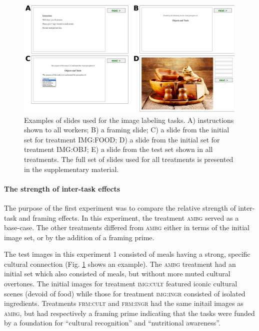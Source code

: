 \documentclass[12pt]{article}
\begin{document}
\begin{figure}
	\centering
	\includegraphics[scale=0.7]{figs/tasks.pdf}
	\caption{Examples of slides used for the image labeling tasks. A) instructions shown to all workers; B) a framing slide; C) a slide from the initial set for treatment IMG:FOOD; D) a slide from the initial set for treatment IMG:OBJ; E) a slide from the test set shown in all treatments. The full set of slides used for all treatments is presented in the supplementary material.}
	\label{fig:task}
\end{figure}




\paragraph{The strength of inter-task effects}
The purpose of the first experiment was to compare the relative strength
of inter-task and framing effects.  In this experiment, the treatment 
\textsc{ambg} served as a base-case.  The other treatments differed from
\textsc{ambg} either in terms of the initial image set, or by the addition of a
framing prime.  

The test images in this experiment 1 consisted of meals having
a strong, specific cultural connection (Fig. \ref{fig:task} shows an example).
The \textsc{ambg} treatment had an initial set which also consisted of meals,
but without more muted cultural overtones.  The initial images for treatment 
\textsc{img:cult} featured iconic cultural scenes (devoid of food) while 
those for treatment \textsc{img:ingr} consisted of isolated ingredients.
Treatments \textsc{frm:cult} and \textsc{frm:ingr} had the same initail images
as \textsc{ambg}, but had respectively a framing prime indicating that the
tasks were funded by a foundation for ``cultural recognition'' and
``nutritional awareness''.
\end{document}
